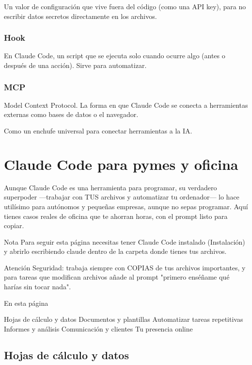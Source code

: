 \documentclass[11pt,a4paper]{report}
\begin{document}
Un valor de configuración que vive fuera del código (como una API key), para no escribir datos secretos directamente en los archivos.

\subsection{Hook}

En Claude Code, un script que se ejecuta solo cuando ocurre algo (antes o después de una acción). Sirve para automatizar.

\subsection{MCP}

Model Context Protocol. La forma en que Claude Code se conecta a herramientas externas como bases de datos o el navegador.

Como un enchufe universal para conectar herramientas a la IA.


\chapter{Claude Code para pymes y oficina}

Aunque Claude Code es una herramienta para programar, su verdadero superpoder —trabajar con TUS archivos y automatizar tu ordenador— lo hace utilísimo para autónomos y pequeñas empresas, aunque no sepas programar. Aquí tienes casos reales de oficina que te ahorran horas, con el prompt listo para copiar.

\begin{calloutbox}{Nota}
Para seguir esta página necesitas tener Claude Code instalado (Instalación) y abrirlo escribiendo claude dentro de la carpeta donde tienes tus archivos.\end{calloutbox}

\begin{calloutbox}{Atención}
Seguridad: trabaja siempre con COPIAS de tus archivos importantes, y para tareas que modifican archivos añade al prompt "primero enséñame qué harías sin tocar nada".\end{calloutbox}

En esta página

 Hojas de cálculo y datos Documentos y plantillas Automatizar tareas repetitivas Informes y análisis Comunicación y clientes Tu presencia online\section{ Hojas de cálculo y datos}
\end{document}
